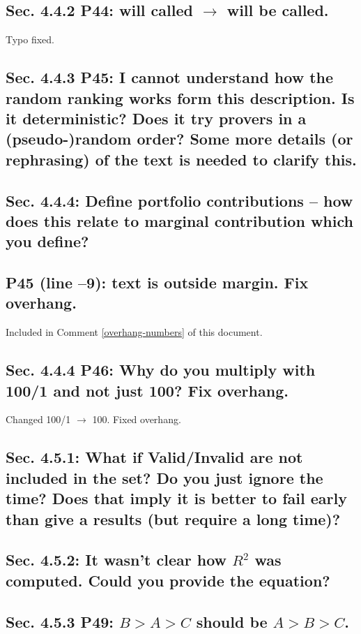 \documentclass[]{article}
\begin{document}
\subsection{Sec. 4.4.2 P44: will called $\rightarrow$ will be called.}

Typo fixed.

\subsection{Sec. 4.4.3 P45: I cannot understand how the random ranking works form this description. Is it deterministic? Does it try provers in a (pseudo-)random order? Some more details (or rephrasing) of the text is needed to clarify this.}

\subsection{Sec. 4.4.4: Define portfolio contributions – how does this relate to marginal contribution which you define?}

\subsection{P45 (line –9): text is outside margin. Fix overhang.}

Included in Comment \ref{overhang-numbers} of this document.

\subsection{Sec. 4.4.4 P46: Why do you multiply with 100/1 and not just 100? Fix overhang.}

Changed 100/1 $\rightarrow$ 100. Fixed overhang.

\subsection{Sec. 4.5.1: What if Valid/Invalid are not included in the set? Do you just ignore the time? Does that imply it is better to fail early than give a results (but require a long time)?}

\subsection{Sec. 4.5.2: It wasn't clear how $R^{2}$ was computed. Could you provide the equation?}

\subsection{Sec. 4.5.3 P49: $B > A > C$ should be $A > B > C$.}
\end{document}
